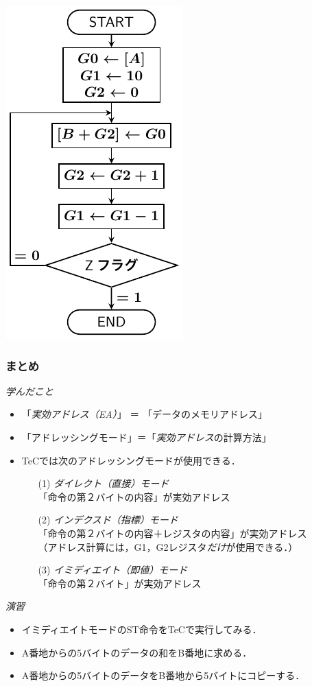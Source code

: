 \documentclass[handout]{beamer}        %
\begin{document}
\begin{frame}
\begin{minipage}{0.38\columnwidth}
    \centerline{\includegraphics[scale=0.7]{../Tikz/flowD.pdf}}
  \end{minipage}
  \vfill
  \vfill
\end{frame}

\begin{frame}
  \frametitle{まとめ}
  \emph{学んだこと}
  \begin{itemize}
  \item 「\emph{実効アドレス（EA）}」 ＝ 「データのメモリアドレス」
  \item 「アドレッシングモード」＝「\emph{実効アドレス}の計算方法」
  \item TeCでは次のアドレッシングモードが使用できる．
    \begin{enumerate}
    \item[(1)] \emph{ダイレクト（直接）モード} \\
      「命令の第２バイトの内容」が実効アドレス
    \item[(2)] \emph{インデクスド（指標）モード} \\
      「命令の第２バイトの内容＋レジスタの内容」が実効アドレス \\
      （アドレス計算には，G1，G2レジスタ\emph{だけ}が使用できる．）
    \item[(3)] \emph{イミディエイト（即値）モード} \\
      「命令の第２バイト」が実効アドレス
    \end{enumerate}
  \end{itemize}
  \vfill
  \emph{演習}
  \begin{itemize}
  \item イミディエイトモードのST命令をTeCで実行してみる．
  \item A番地からの5バイトのデータの和をB番地に求める．
  \item A番地からの5バイトのデータをB番地から5バイトにコピーする．
  \end{itemize}
  \vfill
\end{frame}
\end{document}
